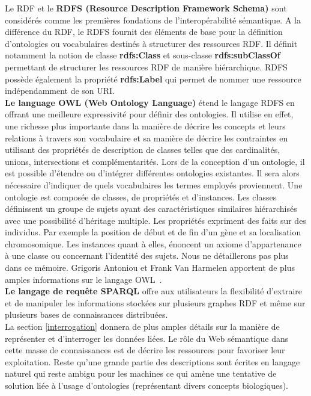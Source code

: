 Le RDF et le \textbf{RDFS (Resource Description Framework Schema)} sont considérés comme les premières fondations de l’interopérabilité sémantique. A la différence du RDF, le RDFS fournit des éléments de base pour la définition d'ontologies ou vocabulaires destinés à structurer des ressources RDF. Il définit notamment la notion de classe \textbf{rdfs:Class} et sous-classe \textbf{rdfs:subClassOf} permettant de structurer les ressources RDF de manière hiérarchique. RDFS possède également la propriété \textbf{rdfs:Label} qui permet de nommer une ressource indépendamment de son URI.\\

\textbf{Le language OWL (Web Ontology Language)} étend le langage RDFS en offrant une meilleure expressivité pour définir des ontologies. Il utilise en effet, une richesse plus importante dans la manière de décrire les concepts et leurs relations à travers son vocabulaire et sa manière de décrire les contraintes en utilisant des propriétés de description de classes telles que des cardinalités, unions, intersections et complémentarités. Lors de la conception d’un ontologie, il est possible d'étendre ou d'intégrer différentes ontologies existantes. Il sera alors nécessaire d'indiquer de quels vocabulaires les termes employés proviennent. Une ontologie est composée de classes, de propriétés et d'instances. Les classes définissent un groupe de sujets ayant des caractéristiques similaires hiérarchisés avec une possibilité d'héritage multiple. Les propriétés expriment des faits sur des individus. Par exemple la position de début et de fin d'un gène et sa localisation chromosomique. Les instances quant à elles, énoncent un axiome d'appartenance à une classe ou concernant l'identité des sujets. Nous ne détaillerons pas plus dans ce mémoire. Grigoris Antoniou et Frank Van Harmelen apportent de plus amples informations sur le langage OWL~\cite{Antoniou2009a}.\\
 
\textbf{Le langage de requête SPARQL} offre aux utilisateurs la flexibilité d'extraire et de manipuler les informations stockées sur plusieurs graphes RDF et même sur plusieurs bases de connaissances distribuées. \\ 


La section \ref{interrogation} donnera de plus amples détails sur la manière de représenter et d’interroger les données liées.
Le rôle du Web sémantique dans cette masse de connaissances est de décrire les ressources pour favoriser leur exploitation. Reste qu'une grande partie des descriptions sont écrites en langage naturel qui reste ambigu pour les machines ce qui amène une tentative de solution liée à l'usage d'ontologies (représentant divers concepts biologiques). \\


